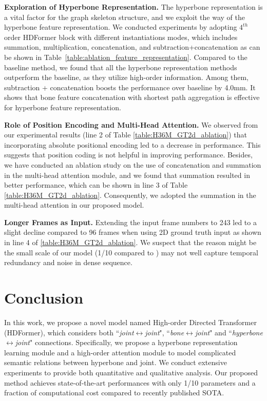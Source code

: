 \documentclass{article}
\begin{document}
\noindent \textbf{Exploration of Hyperbone Representation.} The hyperbone representation is a vital factor for the graph skeleton structure, and we exploit the way of the hyperbone feature representation. We conducted experiments by adopting $4^{th}$ order HDFormer block with different instantiations modes, which includes summation, multiplication, concatenation, and subtraction+concatenation as can be shown in Table~\ref{table:ablation_feature_representation}. Compared to the baseline method, we found that all the hyperbone representation methods outperform the baseline, as they utilize high-order information. Among them, subtraction + concatenation boosts the performance over baseline by 4.0mm. It shows that bone feature concatenation with shortest path aggregation is effective for hyperbone feature representation.


\noindent \textbf{Role of Position Encoding and Multi-Head Attention.} We observed from our experimental results (line 2 of Table \ref{table:H36M_GT2d_ablation}) that incorporating absolute positional encoding led to a decrease in performance. This suggests that position coding is not helpful in improving performance. Besides, we have conducted an ablation study on the use of concatenation and summation in the multi-head attention module, and we found that summation resulted in better performance, which can be shown in line 3 of Table \ref{table:H36M_GT2d_ablation}. Consequently, we adopted the summation in the multi-head attention in our proposed model.

\noindent \textbf{Longer Frames as Input.} Extending the input frame numbers to 243 led to a slight decline compared to 96 frames when using 2D ground truth input as shown in line 4 of \ref{table:H36M_GT2d_ablation}. We suspect that the reason might be the small scale of our model (1/10 compared to \cite{ZhangCVPR22MixSTE}) may not well capture temporal redundancy and noise in dense sequence.

\section{Conclusion}
In this work, we propose a novel model named High-order Directed Transformer (HDFormer), which considers both ``\textit{joint$\leftrightarrow$joint}", ``\textit{bone$\leftrightarrow$joint}" and ``\textit{hyperbone$\leftrightarrow$joint}" connections. Specifically, we propose a hyperbone representation learning module and a high-order attention module to model complicated semantic relations between hyperbone and joint. We conduct extensive experiments to provide both quantitative and qualitative analysis. Our proposed method achieves state-of-the-art performances with only 1/10 parameters and a fraction of computational cost compared to recently published SOTA.
\end{document}
